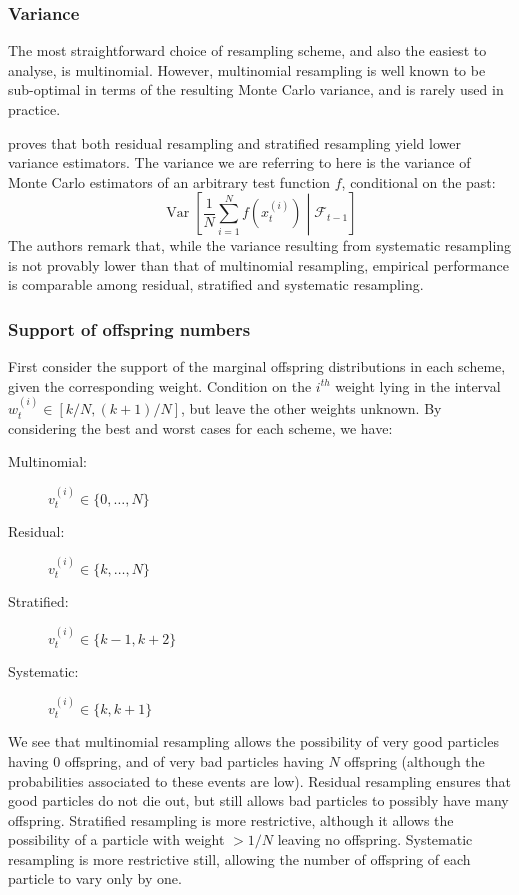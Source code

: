 \documentclass[fleqn]{article}
\theoremstyle{definition}
\newcommand{\V}{\operatorname{Var}}
\newcommand{\F}{\mathcal{F}_{t-1}}
\newcommand{\vt}[2][t]{v_{#1}^{(#2)}}
\newcommand{\wt}[2][t]{w_{#1}^{(#2)}}
\begin{document}
\subsubsection{Variance}
The most straightforward choice of resampling scheme, and also the easiest to analyse, is multinomial. However, multinomial resampling is well known to be sub-optimal in terms of the resulting Monte Carlo variance, and is rarely used in practice.

\citet{douc2005} proves that both residual resampling and stratified resampling yield lower variance estimators. 
The variance we are referring to here is the variance of Monte Carlo estimators of an arbitrary test function $f$, conditional on the past:
\begin{equation*}
\V\left[ \frac{1}{N} \sum_{i=1}^N f(x_t^{(i)}) \middle| \F\right]
\end{equation*}
The authors remark that, while the variance resulting from systematic resampling is not provably lower than that of multinomial resampling, empirical performance is comparable among residual, stratified and systematic resampling.

\subsubsection{Support of offspring numbers}
First consider the support of the marginal offspring distributions in each scheme, given the corresponding weight. Condition on the $i^{th}$ weight lying in the interval $\wt{i} \in [k/N, (k+1)/N]$, but leave the other weights unknown. By considering the best and worst cases for each scheme, we have: 
\begin{description}
\item[Multinomial:] $\vt{i} \in \{0,\dots, N\}$
\item[Residual:] $\vt{i} \in \{k,\dots, N\}$
\item[Stratified:] $\vt{i} \in \{k-1, k+2\}$
\item[Systematic:] $\vt{i} \in \{k, k+1\}$
\end{description}
We see that multinomial resampling allows the possibility of very good particles having $0$ offspring, and of very bad particles having $N$ offspring (although the probabilities associated to these events are low).
Residual resampling ensures that good particles do not die out, but still allows bad particles to possibly have many offspring.
Stratified resampling is more restrictive, although it allows the possibility of a particle with weight $>1/N$ leaving no offspring.
Systematic resampling is more restrictive still, allowing the number of offspring of each particle to vary only by one.
\end{document}
